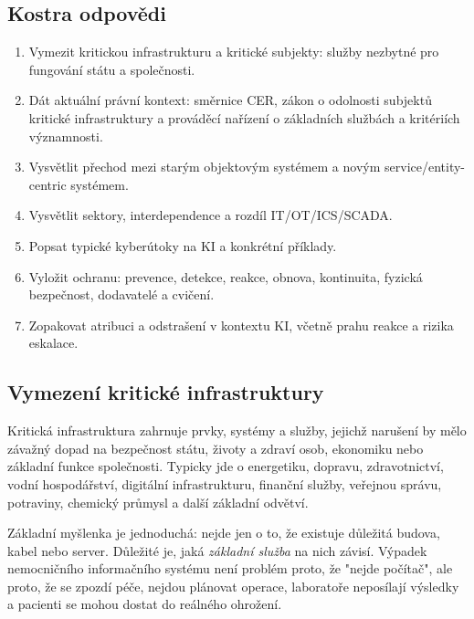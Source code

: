 \subsection*{Kostra odpovědi}
\begin{enumerate}
  \item Vymezit kritickou infrastrukturu a kritické subjekty: služby nezbytné pro fungování státu a společnosti.
  \item Dát aktuální právní kontext: směrnice CER, zákon o odolnosti subjektů kritické infrastruktury a prováděcí nařízení o základních službách a kritériích významnosti.
  \item Vysvětlit přechod mezi starým objektovým systémem a novým service/entity-centric systémem.
  \item Vysvětlit sektory, interdependence a rozdíl IT/OT/ICS/SCADA.
  \item Popsat typické kyberútoky na KI a konkrétní příklady.
  \item Vyložit ochranu: prevence, detekce, reakce, obnova, kontinuita, fyzická bezpečnost, dodavatelé a cvičení.
  \item Zopakovat atribuci a odstrašení v kontextu KI, včetně prahu reakce a rizika eskalace.
\end{enumerate}

\subsection*{Vymezení kritické infrastruktury}
Kritická infrastruktura zahrnuje prvky, systémy a služby, jejichž narušení by mělo závažný dopad na bezpečnost státu, životy a zdraví osob, ekonomiku nebo základní funkce společnosti. Typicky jde o energetiku, dopravu, zdravotnictví, vodní hospodářství, digitální infrastrukturu, finanční služby, veřejnou správu, potraviny, chemický průmysl a další základní odvětví.

Základní myšlenka je jednoduchá: nejde jen o to, že existuje důležitá budova, kabel nebo server. Důležité je, jaká \emph{základní služba} na nich závisí. Výpadek nemocničního informačního systému není problém proto, že "nejde počítač", ale proto, že se zpozdí péče, nejdou plánovat operace, laboratoře neposílají výsledky a pacienti se mohou dostat do reálného ohrožení.


